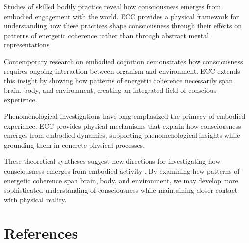 \begin{refsection}
Studies of skilled bodily practice \cite{Ingold2000} reveal how consciousness emerges from embodied engagement with the world. ECC provides a physical framework for understanding how these practices shape consciousness through their effects on patterns of energetic coherence rather than through abstract mental representations.

Contemporary research on embodied cognition \cite{Clark1997} demonstrates how consciousness requires ongoing interaction between organism and environment. ECC extends this insight by showing how patterns of energetic coherence necessarily span brain, body, and environment, creating an integrated field of conscious experience.

Phenomenological investigations \cite{MerleauPonty1962} have long emphasized the primacy of embodied experience. ECC provides physical mechanisms that explain how consciousness emerges from embodied dynamics, supporting phenomenological insights while grounding them in concrete physical processes.

These theoretical syntheses suggest new directions for investigating how consciousness emerges from embodied activity \cite{Varela1991}. By examining how patterns of energetic coherence span brain, body, and environment, we may develop more sophisticated understanding of consciousness while maintaining closer contact with physical reality.

\newpage
\section{References}
\printbibliography[title={},heading=subbibliography]
\end{refsection}